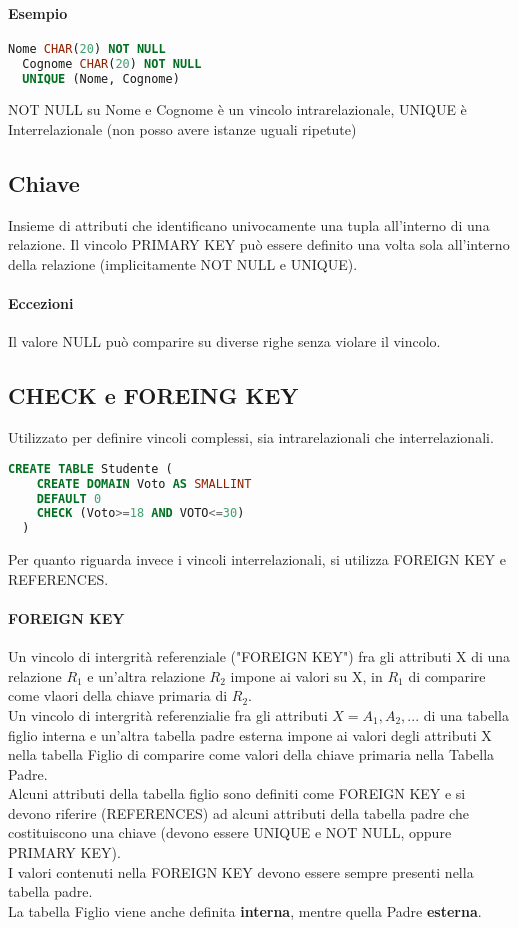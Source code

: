 \paragraph*{Esempio}
\begin{lstlisting}[language=SQL]
  Nome CHAR(20) NOT NULL
  Cognome CHAR(20) NOT NULL 
  UNIQUE (Nome, Cognome)
\end{lstlisting}
NOT NULL su Nome e Cognome è un vincolo intrarelazionale,
UNIQUE è Interrelazionale (non posso avere istanze uguali ripetute)
\subsection{Chiave}
Insieme di attributi che identificano univocamente una tupla all'interno di
una relazione. Il vincolo PRIMARY KEY può essere definito una volta sola all'interno
della relazione (implicitamente NOT NULL e UNIQUE).
\paragraph*{Eccezioni} Il valore NULL può comparire su diverse righe senza violare
il vincolo.
\subsection*{CHECK e FOREING KEY}
Utilizzato per definire vincoli complessi, sia intrarelazionali che interrelazionali.
\begin{lstlisting}[language=SQL]
  CREATE TABLE Studente (
    CREATE DOMAIN Voto AS SMALLINT
    DEFAULT 0
    CHECK (Voto>=18 AND VOTO<=30)
  )
\end{lstlisting}
Per quanto riguarda invece i vincoli interrelazionali, si utilizza FOREIGN KEY e
REFERENCES.\\
\paragraph*{FOREIGN KEY} Un vincolo di intergrità referenziale ("FOREIGN KEY") 
fra gli attributi X di una relazione $R_1$ e un'altra relazione $R_2$ impone ai valori su X,
in $R_1$ di comparire come vlaori della chiave primaria di $R_2$.\\
Un vincolo di intergrità referenzialie fra gli attributi $X={A_1, A_2,...}$ di una
tabella figlio interna e un'altra tabella padre esterna impone ai valori degli attributi X
nella tabella Figlio di comparire come valori della chiave primaria nella Tabella Padre.\\
Alcuni attributi della tabella figlio sono definiti come FOREIGN KEY e si devono riferire (REFERENCES)
ad alcuni attributi della tabella padre che costituiscono una chiave (devono essere UNIQUE e NOT NULL, oppure
PRIMARY KEY).\\
I valori contenuti nella FOREIGN KEY devono essere sempre presenti nella tabella
padre.\\
La tabella Figlio viene anche definita \textbf{interna}, mentre quella Padre \textbf{esterna}.\\
